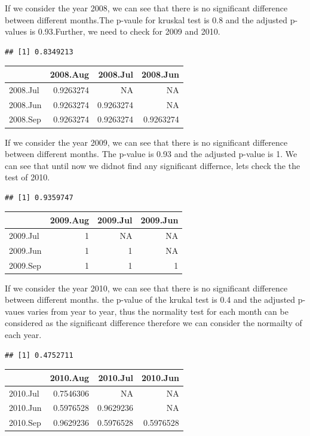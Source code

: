 \documentclass[
]{article}
\begin{document}
If we consider the year 2008, we can see that there is no significant
difference between different months.The p-vaule for kruskal test is 0.8
and the adjusted p-values is 0.93.Further, we need to check for 2009 and
2010.

\begin{verbatim}
## [1] 0.8349213
\end{verbatim}

\begin{longtable}[]{@{}lrrr@{}}
\toprule
& 2008.Aug & 2008.Jul & 2008.Jun\tabularnewline
\midrule
\endhead
2008.Jul & 0.9263274 & NA & NA\tabularnewline
2008.Jun & 0.9263274 & 0.9263274 & NA\tabularnewline
2008.Sep & 0.9263274 & 0.9263274 & 0.9263274\tabularnewline
\bottomrule
\end{longtable}

If we consider the year 2009, we can see that there is no significant
difference between different months. The p-value is 0.93 and the
adjusted p-value is 1. We can see that until now we didnot find any
significant differnce, lets check the the test of 2010.

\begin{verbatim}
## [1] 0.9359747
\end{verbatim}

\begin{longtable}[]{@{}lrrr@{}}
\toprule
& 2009.Aug & 2009.Jul & 2009.Jun\tabularnewline
\midrule
\endhead
2009.Jul & 1 & NA & NA\tabularnewline
2009.Jun & 1 & 1 & NA\tabularnewline
2009.Sep & 1 & 1 & 1\tabularnewline
\bottomrule
\end{longtable}

If we consider the year 2010, we can see that there is no significant
difference between different months. the p-value of the krukal test is
0.4 and the adjusted p-vaues varies from year to year, thus the
normality test for each month can be considered as the significant
difference therefore we can consider the normailty of each year.

\begin{verbatim}
## [1] 0.4752711
\end{verbatim}

\begin{longtable}[]{@{}lrrr@{}}
\toprule
& 2010.Aug & 2010.Jul & 2010.Jun\tabularnewline
\midrule
\endhead
2010.Jul & 0.7546306 & NA & NA\tabularnewline
2010.Jun & 0.5976528 & 0.9629236 & NA\tabularnewline
2010.Sep & 0.9629236 & 0.5976528 & 0.5976528\tabularnewline
\bottomrule
\end{longtable}
\end{document}
